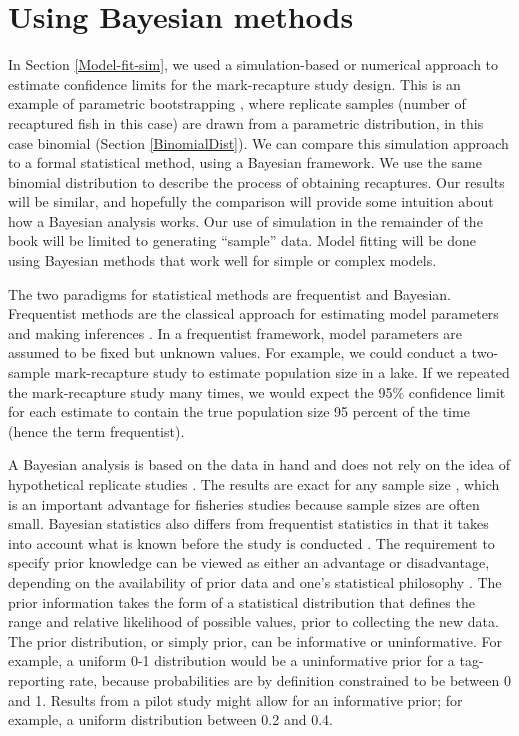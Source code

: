 \documentclass[
]{krantz}
\begin{document}
\hypertarget{JAGS-model-fit}{%
\section{Using Bayesian methods}\label{JAGS-model-fit}}

In Section \ref{Model-fit-sim}, we used a simulation-based or numerical approach to estimate confidence limits for the mark-recapture study design. This is an example of parametric bootstrapping \citep{efron.tibshirani_1993}, where replicate samples (number of recaptured fish in this case) are drawn from a parametric distribution, in this case binomial (Section \ref{BinomialDist}). We can compare this simulation approach to a formal statistical method, using a Bayesian framework. We use the same binomial distribution to describe the process of obtaining recaptures. Our results will be similar, and hopefully the comparison will provide some intuition about how a Bayesian analysis works. Our use of simulation in the remainder of the book will be limited to generating ``sample'' data. Model fitting will be done using Bayesian methods that work well for simple or complex models.

The two paradigms for statistical methods are frequentist and Bayesian. Frequentist methods are the classical approach for estimating model parameters and making inferences \citep{link.etal_2002, royle.dorazio_2008}. In a frequentist framework, model parameters are assumed to be fixed but unknown values. For example, we could conduct a two-sample mark-recapture study to estimate population size in a lake. If we repeated the mark-recapture study many times, we would expect the 95\% confidence limit for each estimate to contain the true population size 95 percent of the time (hence the term frequentist).

A Bayesian analysis is based on the data in hand and does not rely on the idea of hypothetical replicate studies \citep{mccarthy2007, royle.dorazio_2008}. The results are exact for any sample size \citep{kéry.schaub_2011}, which is an important advantage for fisheries studies because sample sizes are often small. Bayesian statistics also differs from frequentist statistics in that it takes into account what is known before the study is conducted \citep{mccarthy2007}. The requirement to specify prior knowledge can be viewed as either an advantage or disadvantage, depending on the availability of prior data and one's statistical philosophy \citep{ellison_2004, mccarthy2007, kéry_2010, kéry.schaub_2011, dorazio_2016, doll.jacquemin_2018, banner.etal_2020}. The prior information takes the form of a statistical distribution that defines the range and relative likelihood of possible values, prior to collecting the new data. The prior distribution, or simply prior, can be informative or uninformative. For example, a uniform 0-1 distribution would be a uninformative prior for a tag-reporting rate, because probabilities are by definition constrained to be between 0 and 1. Results from a pilot study might allow for an informative prior; for example, a uniform distribution between 0.2 and 0.4.
\end{document}
